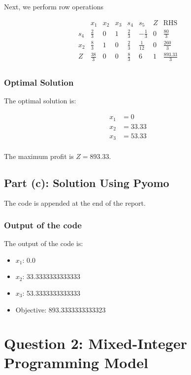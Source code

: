 \documentclass[12pt]{article}
\begin{document}
Next, we perform row operations

\[
\begin{array}{c|cccccc|c}
 & x_1 & x_2 & x_3 & s_4 & s_5 & Z & \text{RHS} \\
\hline
s_4 & \frac{2}{3} & 0 & 1 & \frac{2}{3} & -\frac{1}{3} & 0 & \frac{80}{3} \\
x_2 & \frac{8}{3} & 1 & 0 & \frac{2}{3} & \frac{1}{12} & 0 & \frac{260}{3} \\
\hline
Z & \frac{38}{3} & 0 & 0 & \frac{8}{3} & 6 & 1 & \frac{893.33}{3} \\
\end{array}
\]

\subsubsection*{Optimal Solution}

The optimal solution is:

\[
\begin{aligned}
x_1 &= 0 \\
x_2 &= 33.33 \\
x_3 &= 53.33 \\
\end{aligned}
\]

The maximum profit is \( Z = 893.33 \).

\subsection*{Part (c): Solution Using Pyomo}
The code is appended at the end of the report.

\subsubsection*{Output of the code}

The output of the code is:

\begin{itemize}
    \item \(x_1\): 0.0
    \item \(x_2\): 33.3333333333333
    \item \(x_3\): 53.3333333333333
    \item Objective: 893.3333333333323
\end{itemize}


\section*{Question 2: Mixed-Integer Programming Model}
\end{document}
